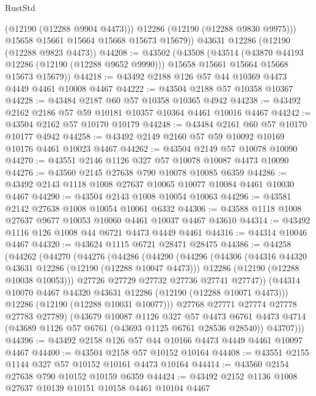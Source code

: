 \begin{lexlean}{RustStd}
\begin{coremodule}
            (@12190 (@12288 @9904 @4473)))
          @12286
          (@12190 (@12288 @9830 @9975)))
        @15658
        @15661
        @15664
        @15668
        @15673
        @15679))
    @43631
    @12286
    (@12190 (@12288 @9823 @4473))
@44208 := @43502
    (@43508
      (@43514
        (@43870 @44193 @12286 (@12190 (@12288 @9652 @9990)))
        @15658
        @15661
        @15664
        @15668
        @15673
        @15679))
@44218 := @43492 @2188 @126 @57 @44 @10369 @4473 @4449 @4461 @10008 @4467
@44222 := @43504 @2188 @57 @10358 @10367
@44228 := @43484 @2187 @60 @57 @10358 @10365 @4942
@44238 := @43492 @2162 @2186 @57 @59 @10181 @10357 @10364 @4461 @10016 @4467
@44242 := @43504 @2162 @57 @10170 @10179
@44248 := @43484 @2161 @60 @57 @10170 @10177 @4942
@44258 := @43492 @2149 @2160 @57 @59 @10092 @10169 @10176 @4461 @10023 @4467
@44262 := @43504 @2149 @57 @10078 @10090
@44270 := @43551 @2146 @1126 @327 @57 @10078 @10087 @4473 @10090
@44276 := @43560 @2145 @27638 @790 @10078 @10085 @6359
@44286 := @43492 @2143 @1118 @1008 @27637 @10065 @10077 @10084 @4461 @10030 @4467
@44290 := @43504 @2143 @1008 @10054 @10063
@44296 := @43581 @2142 @27638 @1008 @10054 @10061 @6332
@44306 := @43588 @1118 @1008 @27637 @9677 @10053 @10060 @4461 @10037 @4467 @43610
@44314 := @43492 @1116 @126 @1008 @44 @6721 @4473 @4449 @4461
@44316 := @44314 @10046 @4467
@44320 := @43624 @1115 @6721 @28471 @28475
@44386 := @44258
    (@44262
      (@44270
        (@44276
          (@44286
            (@44290
              (@44296
                (@44306
                  (@44316 @44320 @43631 @12286 (@12190 (@12288 @10047 @4473)))
                  @12286
                  (@12190 (@12288 @10038 @10053)))
                @27726
                @27729
                @27732
                @27736
                @27741
                @27747))
            (@44314 @10070 @4467 @44320 @43631 @12286 (@12190 (@12288 @10071 @4473)))
            @12286
            (@12190 (@12288 @10031 @10077)))
          @27768
          @27771
          @27774
          @27778
          @27783
          @27789)
        (@43679
          @10087
          @1126
          @327
          @57
          @4473
          @6761
          @4473
          @4714
          (@43689 @1126 @57 @6761 (@43693 @1125 @6761 @28536 @28540))
          @43707)))
@44396 := @43492 @2158 @126 @57 @44 @10166 @4473 @4449 @4461 @10097 @4467
@44400 := @43504 @2158 @57 @10152 @10164
@44408 := @43551 @2155 @1144 @327 @57 @10152 @10161 @4473 @10164
@44414 := @43560 @2154 @27638 @790 @10152 @10159 @6359
@44424 := @43492 @2152 @1136 @1008 @27637 @10139 @10151 @10158 @4461 @10104 @4467

\end{coremodule}
\end{lexlean}
